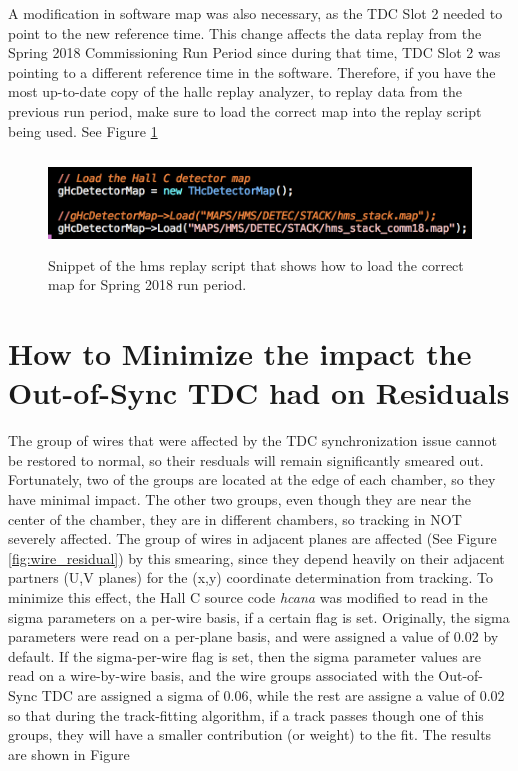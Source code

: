 \documentclass[11pt]{article}
\begin{document}
A modification in software map was also necessary, as the TDC Slot 2 needed to point to the new reference time. This change affects the data replay from the
Spring 2018 Commissioning Run Period since during that time, TDC Slot 2 was pointing to a different reference time in the software. Therefore, if you have the most up-to-date copy of the
hallc replay analyzer, to replay data from the previous run period, make sure to load the correct map into the replay script being used. See Figure \ref{fig:map} 

\begin{figure}[h]
  \centering
  \includegraphics[width=5.0in, height=1.0in]{loadmap.png}
  \caption{Snippet of the hms replay script that shows how to load the correct map for Spring 2018 run period.}
  \label{fig:map}
\end{figure}

\section{How to Minimize the impact the Out-of-Sync TDC had on Residuals }
\noindent The group of wires that were affected by the TDC synchronization issue cannot be restored to normal, so their resduals will remain significantly smeared out. Fortunately,
two of the groups are located at the edge of each chamber, so they have minimal impact. The other two groups, even though they are near the center of the chamber, they are
in different chambers, so tracking in NOT severely affected. The group of wires in adjacent planes are affected (See Figure \ref{fig:wire_residual}) by this smearing, since
they depend heavily on their adjacent partners (U,V planes) for the (x,y) coordinate determination from tracking. To minimize this effect, the Hall C source code \textit{hcana}
was modified to read in the sigma parameters on a per-wire basis, if a certain flag is set. Originally, the sigma parameters were read on a per-plane basis, and were assigned a
value of 0.02 by default. If the sigma-per-wire flag is set, then the sigma parameter values are read on a wire-by-wire basis, and the wire groups associated with the
Out-of-Sync TDC are assigned a sigma of 0.06, while the rest are assigne a value of 0.02 so that during the track-fitting algorithm, if a track passes though one of this groups,
they will have a smaller contribution (or weight) to the fit. The results are shown in Figure

\newpage
\onecolumn


\end{document}
